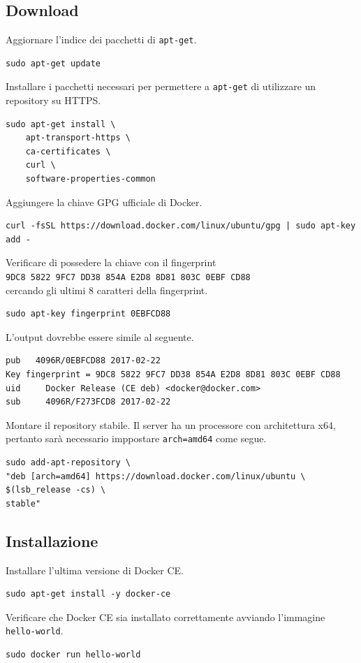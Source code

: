 \subsection{Download}
Aggiornare l'indice dei pacchetti di \verb|apt-get|.
\begin{lstlisting}
sudo apt-get update
\end{lstlisting}
Installare i pacchetti necessari per permettere a \verb|apt-get| di utilizzare un repository su HTTPS.
\begin{lstlisting}
sudo apt-get install \ 
    apt-transport-https \
    ca-certificates \
    curl \
    software-properties-common
\end{lstlisting}
Aggiungere la chiave GPG ufficiale di Docker.
\begin{lstlisting}
curl -fsSL https://download.docker.com/linux/ubuntu/gpg | sudo apt-key add -
\end{lstlisting}
Verificare di possedere la chiave con il fingerprint\\
\verb|9DC8 5822 9FC7 DD38 854A E2D8 8D81 803C 0EBF CD88|\\
cercando gli ultimi 8 caratteri della fingerprint.
\begin{lstlisting}
sudo apt-key fingerprint 0EBFCD88
\end{lstlisting}
L'output dovrebbe essere simile al seguente.
\begin{lstlisting}
pub   4096R/0EBFCD88 2017-02-22
Key fingerprint = 9DC8 5822 9FC7 DD38 854A E2D8 8D81 803C 0EBF CD88
uid     Docker Release (CE deb) <docker@docker.com>
sub     4096R/F273FCD8 2017-02-22
\end{lstlisting}
Montare il repository stabile. Il server ha un processore con architettura x64, pertanto sarà necessario imppostare \verb|arch=amd64| come segue.
\begin{lstlisting}
sudo add-apt-repository \
"deb [arch=amd64] https://download.docker.com/linux/ubuntu \
$(lsb_release -cs) \
stable"
\end{lstlisting}

\subsection{Installazione}
Installare l'ultima versione di Docker CE.
\begin{lstlisting}
sudo apt-get install -y docker-ce
\end{lstlisting}
Verificare che Docker CE sia installato correttamente avviando l'immagine \verb|hello-world|.
\begin{lstlisting}
sudo docker run hello-world
\end{lstlisting}


